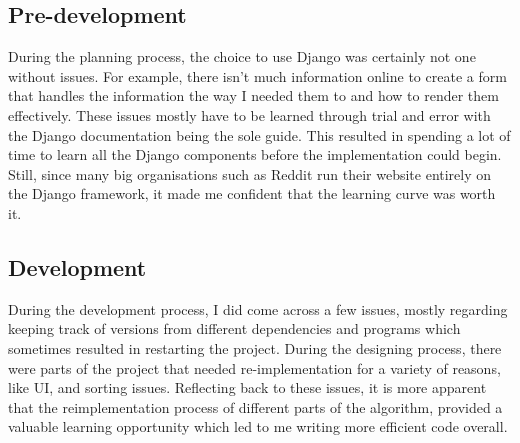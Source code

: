 \subsection{Pre-development}
During the planning process, the choice to use Django was certainly not one without issues. For example, there isn't much information online to create a form that handles the information the way I needed them to and how to render them effectively. These issues mostly have to be learned through trial and error with the Django documentation being the sole guide. This resulted in spending a lot of time to learn all the Django components before the implementation could begin. Still, since many big organisations such as Reddit run their website entirely on the Django framework, it made me confident that the learning curve was worth it.

\subsection{Development}
During the development process, I did come across a few issues, mostly regarding keeping track of versions from different dependencies and programs which sometimes resulted in restarting the project. During the designing process, there were parts of the project that needed re-implementation for a variety of reasons, like UI, and sorting issues. Reflecting back to these issues, it is more apparent that the reimplementation process of different parts of the algorithm, provided a valuable learning opportunity which led to me writing more efficient code overall.
